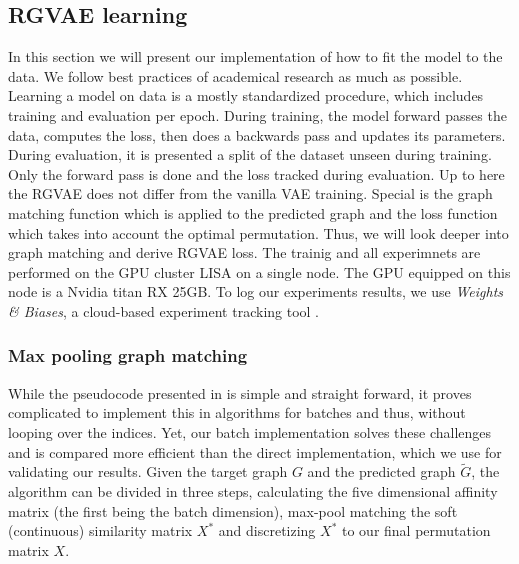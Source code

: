 \subsection{RGVAE learning}

In this section we will present our implementation of how to fit the model to the data. We follow best practices of academical research as much as possible. Learning a model on data is a mostly standardized procedure, which includes training and evaluation per epoch. During training, the model forward passes the data, computes the loss, then does a backwards pass and updates its parameters. During evaluation, it is presented a split of the dataset unseen during training. Only the forward pass is done and the loss tracked during evaluation. Up to here the RGVAE does not differ from the vanilla VAE training. Special is the graph matching function which is applied to the predicted graph and the loss function which takes into account the optimal permutation. Thus, we will look deeper into graph matching and derive RGVAE loss.
The trainig and all experimnets are performed on the GPU cluster LISA on a single node. The GPU equipped on this node is a Nvidia titan RX 25GB. To log our experiments results, we use \textit{Weights & Biases}, a cloud-based experiment tracking tool \cite{wandb}.




\subsubsection{Max pooling graph matching}

While the pseudocode presented in \cite{cho_finding_2014} is simple and straight forward, it proves complicated to implement this in algorithms for batches and thus, without looping over the indices. Yet, our batch implementation solves these challenges and is compared more efficient than the direct implementation, which we use for validating our results. Given the target graph $G$ and the predicted graph $\tilde{G}$, the algorithm can be divided in three steps, calculating the five dimensional affinity matrix (the first being the batch dimension), max-pool matching the soft (continuous) similarity matrix $X^*$ and discretizing $X^*$ to our final permutation matrix $X$.


